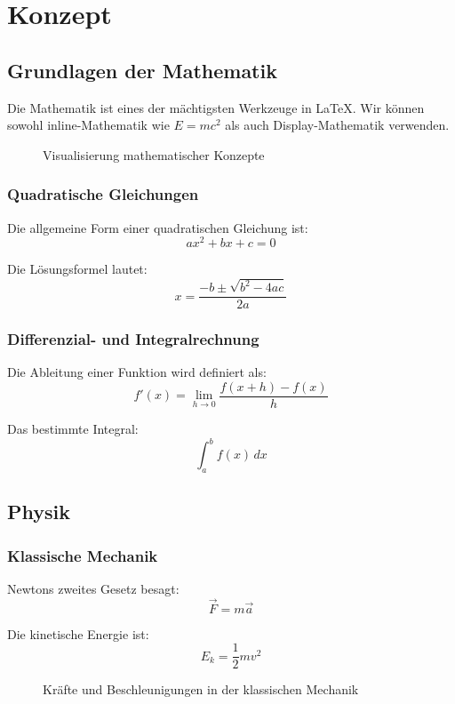 \chapter{Konzept}
\section{Grundlagen der Mathematik}

Die Mathematik ist eines der mächtigsten Werkzeuge in \LaTeX{}. Wir können sowohl inline-Mathematik wie $E = mc^2$ als auch Display-Mathematik verwenden.

\begin{figure}[h]
\centering
{}
\caption{Visualisierung mathematischer Konzepte}
\label{fig:math_visualization}
\end{figure}

\subsection{Quadratische Gleichungen}

Die allgemeine Form einer quadratischen Gleichung ist:
\[
ax^2 + bx + c = 0
\]

Die Lösungsformel lautet:
\[
x = \frac{-b \pm \sqrt{b^2 - 4ac}}{2a}
\]

\subsection{Differenzial- und Integralrechnung}

Die Ableitung einer Funktion wird definiert als:
\[
f'(x) = \lim_{h \to 0} \frac{f(x+h) - f(x)}{h}
\]

Das bestimmte Integral:
\[
\int_a^b f(x) \, dx
\]

\section{Physik}

\subsection{Klassische Mechanik}

Newtons zweites Gesetz besagt:
\[
\vec{F} = m \vec{a}
\]

Die kinetische Energie ist:
\[
E_k = \frac{1}{2}mv^2
\]

\begin{figure}[h]
\centering
{}
\caption{Kräfte und Beschleunigungen in der klassischen Mechanik}
\label{fig:classical_mechanics}
\end{figure}
